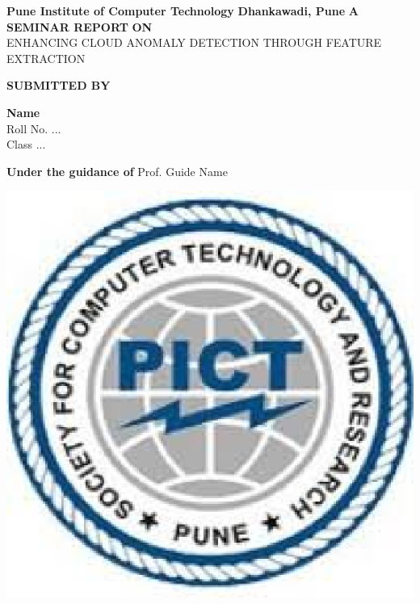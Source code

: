 \documentclass[a4paper, 12pt]{article}
\begin{document}
 
\begin{titlepage}
    \begin{center}
        \vspace*{1cm}
        
        \large
                \textbf{Pune Institute of Computer Technology}	
                \linebreak
		\textbf{Dhankawadi, Pune}
        \vspace{0.5cm}
                        \linebreak
                        \linebreak
        \textbf{A SEMINAR REPORT }
        \linebreak
        \textbf{ON }
        \linebreak
        \vspace{0.5cm}
        \large
        \\ENHANCING CLOUD ANOMALY DETECTION THROUGH FEATURE EXTRACTION 
        \linebreak
        \linebreak
		
		\textbf{SUBMITTED BY}
		\vspace{1cm}
		
        \textbf{ Name }
        \\ Roll No. ...
        \\ Class ...
        \linebreak
        \linebreak
		        
        \textbf{\large{Under the guidance of}}
		\linebreak
	    Prof. Guide Name
		\linebreak
        
        
        
        \vspace{0.8cm}
        

        \includegraphics[scale=0.6]{pict}   
        

\end{center}
\end{titlepage}
\end{document}

